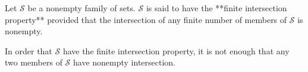 Let $\mathcal{S}$ be a nonempty family of sets. $\mathcal{S}$ is said to have the **finite intersection property** provided that the intersection of any finite number of members of $\mathcal{S}$ is nonempty.

In order that $\mathcal{S}$ have the finite intersection property, it is not enough that any two members of $\mathcal{S}$ have nonempty intersection.

